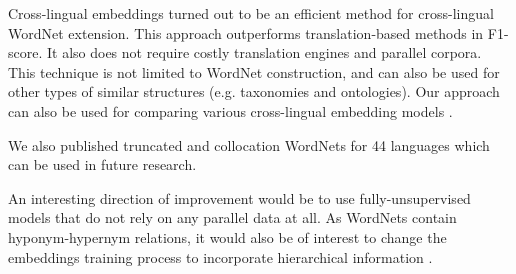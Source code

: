 \documentclass[11pt,a4paper]{article}
\begin{document}
Cross-lingual embeddings turned out to be an efficient method for cross-lingual WordNet extension. This approach outperforms translation-based methods in F1-score. It also does not require costly translation engines and parallel corpora. This technique is not limited to WordNet construction, and can also be used for other types of similar structures (e.g. taxonomies and ontologies). Our approach can also be used for comparing various cross-lingual embedding models \cite{Bakarov2018}.

We also published truncated and collocation WordNets for 44 languages which can be used in future research.

An interesting direction of improvement would be to use fully-unsupervised models that do not rely on any parallel data at all.  As WordNets contain hyponym-hypernym relations, it would also be of interest to change the embeddings training process to incorporate hierarchical information \cite{alsuhaibani}.



\end{document}
